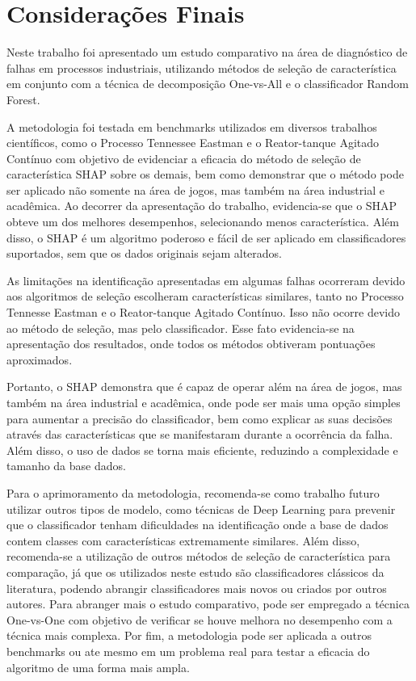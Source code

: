 \chapter{Considerações Finais}
\label{sec-conclusoes}

Neste trabalho foi apresentado um estudo comparativo na área de diagnóstico de falhas em processos industriais, utilizando métodos de seleção de característica em conjunto com a técnica de decomposição One-vs-All e o classificador Random Forest.

A metodologia foi testada em benchmarks utilizados em diversos trabalhos científicos, como o Processo Tennessee Eastman e o Reator-tanque Agitado Contínuo com objetivo de evidenciar a eficacia do método de seleção de característica SHAP sobre os demais, bem como demonstrar que o método pode ser aplicado não somente na área de jogos, mas também na área industrial e acadêmica. Ao decorrer da apresentação do trabalho, evidencia-se que o SHAP obteve um dos melhores desempenhos, selecionando menos característica. Além disso, o SHAP é um algoritmo poderoso e fácil de ser aplicado em classificadores suportados, sem que os dados originais sejam alterados.  

As limitações na identificação apresentadas em algumas falhas ocorreram devido aos algoritmos de seleção escolheram características similares, tanto no Processo Tennesse Eastman e o Reator-tanque Agitado Contínuo. Isso não ocorre devido ao método de seleção, mas pelo classificador. Esse fato evidencia-se na apresentação dos resultados, onde todos os métodos obtiveram pontuações aproximados. 

Portanto, o SHAP demonstra que é capaz de operar além na área de jogos, mas também na área industrial e acadêmica, onde pode ser mais uma opção simples para aumentar a precisão do classificador, bem como explicar as suas decisões através das características que se manifestaram durante a ocorrência da falha. Além disso, o uso de dados se torna mais eficiente, reduzindo a complexidade e tamanho da base dados.

Para o aprimoramento da metodologia, recomenda-se como trabalho futuro utilizar outros tipos de modelo, como técnicas de Deep Learning para prevenir que o classificador tenham dificuldades na identificação onde a base de dados contem classes com características extremamente similares. Além disso, recomenda-se a utilização de outros métodos de seleção de característica para comparação, já que os utilizados neste estudo são classificadores clássicos da literatura, podendo abrangir classificadores mais novos ou criados por outros autores. Para abranger mais o estudo comparativo, pode ser empregado a técnica One-vs-One com objetivo de verificar se houve melhora no desempenho com a técnica mais complexa. Por fim, a metodologia pode ser aplicada a outros benchmarks ou ate mesmo em um problema real para testar a eficacia do algoritmo de uma forma mais ampla.